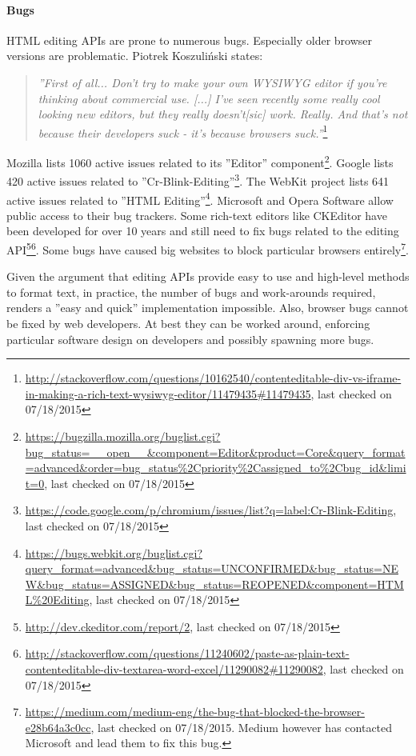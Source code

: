 \paragraph{Bugs} 

HTML editing APIs are prone to numerous bugs. Especially older browser versions are problematic. Piotrek Koszuli\'{n}ski states:

\begin{quotation}
\textit{''First of all... Don't try to make your own WYSIWYG editor if you're thinking about commercial use. [...] I've seen recently some really cool looking new editors, but they really doesn't[sic] work. Really. And that's not because their developers suck - it's because browsers suck.''}\footnote{\url{http://stackoverflow.com/questions/10162540/contenteditable-div-vs-iframe-in-making-a-rich-text-wysiwyg-editor/11479435\#11479435}, last checked on 07/18/2015}
\end{quotation}

\noindent Mozilla lists 1060 active issues related to its ''Editor'' component\footnote{\url{https://bugzilla.mozilla.org/buglist.cgi?bug\_status=\_\_open\_\_\&component=Editor\&product=Core\&query\_format=advanced\&order=bug\_status\%2Cpriority\%2Cassigned\_to\%2Cbug\_id\&limit=0}, last checked on 07/18/2015}. Google lists 420 active issues related to ''Cr-Blink-Editing''\footnote{\url{https://code.google.com/p/chromium/issues/list?q=label:Cr-Blink-Editing}, last checked on 07/18/2015}. The WebKit project lists 641 active issues related to ''HTML Editing''\footnote{\url{https://bugs.webkit.org/buglist.cgi?query\_format=advanced\&bug\_status=UNCONFIRMED\&bug\_status=NEW\&bug\_status=ASSIGNED\&bug\_status=REOPENED\&component=HTML\%20Editing}, last checked on 07/18/2015}. Microsoft and Opera Software allow public access to their bug trackers. Some rich-text editors like CKEditor have been developed for over 10 years and still need to fix bugs related to the editing API\footnote{\url{http://dev.ckeditor.com/report/2}, last checked on 07/18/2015}\footnote{\url{http://stackoverflow.com/questions/11240602/paste-as-plain-text-contenteditable-div-textarea-word-excel/11290082#11290082}, last checked on 07/18/2015}. Some bugs have caused big websites to block particular browsers entirely\footnote{\url{https://medium.com/medium-eng/the-bug-that-blocked-the-browser-e28b64a3c0cc}, last checked on 07/18/2015. Medium however has contacted Microsoft and lead them to fix this bug.}.

Given the argument that editing APIs provide easy to use and high-level methods to format text, in practice, the number of bugs and work-arounds required, renders a ''easy and quick'' implementation impossible. Also, browser bugs cannot be fixed by web developers. At best they can be worked around, enforcing particular software design on developers and possibly spawning more bugs.

